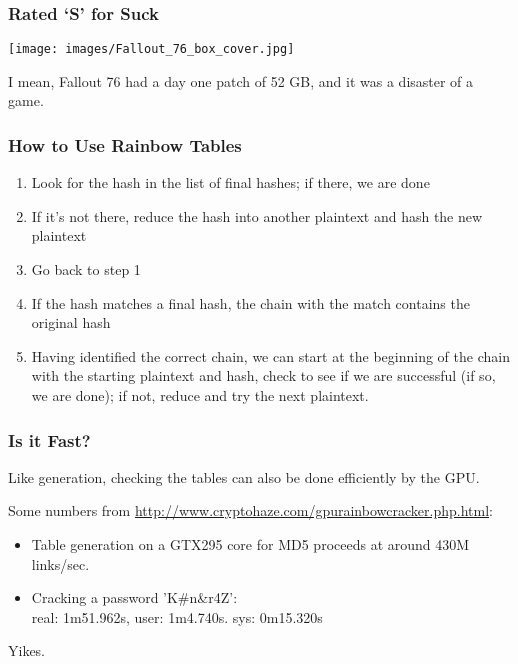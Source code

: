 \begin{frame}
\frametitle{Rated `S' for Suck}

\begin{center}
\texttt{[image: images/Fallout\_76\_box\_cover.jpg]}
\end{center}

I mean, Fallout 76 had a day one patch of 52 GB, and it was a disaster of a game.

\end{frame}


\begin{frame}
\frametitle{How to Use Rainbow Tables}

\begin{enumerate}
	\item Look for the hash in the list of final hashes; if there, we are done
	\item If it's not there, reduce the hash into another plaintext and hash the new plaintext
	\item Go back to step 1
	\item If the hash matches a final hash, the chain with the match contains the original hash
	\item Having identified the correct chain, we can start at the beginning of the chain with the starting plaintext and hash, check to see if we are successful (if so, we are done); if not, reduce and try the next plaintext. 
\end{enumerate} 

\end{frame}


\begin{frame}
\frametitle{Is it Fast?}

Like generation, checking the tables can also be done efficiently by the GPU.

Some numbers from \url{http://www.cryptohaze.com/gpurainbowcracker.php.html}: 

\begin{itemize}
	\item Table generation on a GTX295 core for MD5 proceeds at around 430M links/sec.
	\item Cracking a password 'K\#n\&r4Z': \\ \qquad real: 1m51.962s, user: 1m4.740s. sys: 0m15.320s
\end{itemize}

Yikes.

\end{frame}

